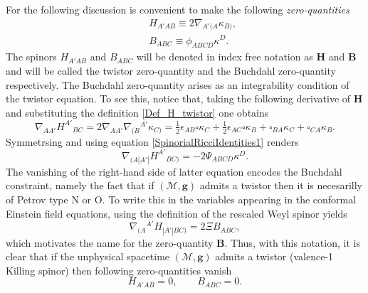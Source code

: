\documentclass[10pt,a4paper]{article}
\theoremstyle{plain}
\def\bmg{{\bm g}}
\def\bmB{{\bm B}}
\def\bmH{{\bm H}}
\begin{document}
For the following discussion is convenient to make the following
\emph{zero-quantities}
\begin{subequations}
  \begin{eqnarray}
   && H_{A'AB} \equiv 2
    \nabla_{A'(A}\kappa_{B)},\label{Def_H_twistor}\\ && B_{ABC}
    \equiv \phi_{ABCD}\kappa^D.\label{Def_B_twistor}
    \end{eqnarray}
\end{subequations}
The spinors $H_{A'AB}$ and $B_{ABC}$ will be denoted in index free
notation as $\bmH$ and $\bmB$ and will be called the twistor
zero-quantity and the Buchdahl zero-quantity respectively.  The
Buchdahl zero-quantity arises as an integrability condition of the
twistor equation.  To see this, notice that, taking the following
derivative of $\bmH$ and substituting the definition
\eqref{Def_H_twistor} one obtains
  \begin{equation}\label{curl_H_twistor}
  \nabla_{AA'}H^{A'}{}_{BC}= 2 \nabla_{AA'}\nabla_{(B}{}^{A'}\kappa
  _{C)} = \tfrac{1}{2} \epsilon _{AB} \square \kappa _{C}  +
  \tfrac{1}{2}  \epsilon _{AC} \square \kappa _{B} +
  \square_{BA}\kappa _{C} + \square_{CA}\kappa _{B}.
  \end{equation}
  Symmetrsing and using equation \eqref{SpinorialRicciIdentities1} renders
  \[
  \nabla_{(A|A'|}H^{A'}{}_{BC)}= - 2\Psi_{ABCD}\kappa^D.
  \]
  The vanishing of the right-hand side of latter equation encodes the
  Buchdahl constraint, namely the fact that if $(\mathcal{M},\bmg)$
  admits a twistor then it is necesarilly of Petrov type N or O. To
  write this in the variables appearing in the conformal Einstein
  field equations, using the definition of the rescaled Weyl spinor
  yields
  \begin{equation}\label{Curl_H_sym_toB_twistor}
  \nabla_{(A}{}^{A'}H_{|A'|BC)} = 2\Xi B_{ABC},
  \end{equation}
  which motivates the name for the zero-quantity $\bmB$.
  Thus, with this notation, it is clear that if the unphysical spacetime
  $(\mathcal{M},\bmg)$ admits a twistor (valence-1 Killing spinor) then following
  zero-quantities vanish
  \begin{equation}
H_{A'AB}=0, \qquad B_{ABC}=0.
  \end{equation}
\end{document}
